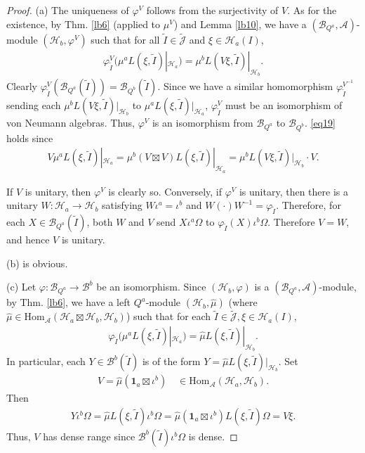 \documentclass[11pt,b5paper,notitlepage]{article}
\theoremstyle{definition}
\theoremstyle{plain}
\newcommand{\mc}{\mathcal}
\newcommand{\wtd}{\widetilde}
\newcommand{\wht}{\widehat}
\newcommand{\id}{\mathbf{1}}
\newcommand{\Hom}{\mathrm{Hom}}
\newcommand{\Jtd}{\widetilde{\mathcal J}}
\numberwithin{equation}{section}
\begin{document}
\begin{proof}
(a) The uniqueness of $\varphi^V$ follows from the surjectivity of $V$. As for the existence, by Thm. \ref{lb6} (applied to $\mu^V$) and Lemma \ref{lb10}, we have a $(\mc B_{Q^a},\mc A)$-module $(\mc H_b,\varphi^V)$ such that for all $\wtd I\in\Jtd$ and $\xi\in\mc H_a(I)$,
\begin{align}
\varphi^V_{\wtd I}\big(\mu^aL(\xi,\wtd I)|_{\mc H_a}\big)=\mu^b L(V\xi,\wtd I)|_{\mc H_b}.	
\end{align}
Clearly $\varphi^V_{\wtd I}(\mc B_{Q^a}(\wtd I))=\mc B_{Q^b}(\wtd I)$. Since we have a similar homomorphism $\varphi_{\wtd I}^{V^{-1}}$ sending each $\mu^b L(V\xi,\wtd I)|_{\mc H_b}$ to $\mu^aL(\xi,\wtd I)|_{\mc H_a}$, $\varphi^V_{\wtd I}$ must be an isomorphism of von Neumann algebras. Thus, $\varphi^V$ is an isomorphism from $\mc B_{Q^a}$ to $\mc B_{Q^b}$. \eqref{eq19} holds since
\begin{align*}
V\mu^a L(\xi,\wtd I)|_{\mc H_a}=\mu^b(V\boxtimes V)L(\xi,\wtd I)|_{\mc H_a}=\mu^b L(V\xi,\wtd I)|_{\mc H_b}\cdot V.	
\end{align*}

If $V$ is unitary, then $\varphi^V$ is clearly so. Conversely, if $\varphi^V$ is unitary, then there is a unitary  $W:\mc H_a\rightarrow\mc H_b$ satisfying $W\iota^a=\iota^b$ and $W(\cdot )W^{-1}=\varphi_{\wtd I}$. Therefore, for each $X\in\mc B_{Q^a}(\wtd I)$, both $W$ and $V$ send $X\iota^a\Omega$ to $\varphi_{\wtd I}(X)\iota^b\Omega$. Therefore $V=W$, and hence $V$ is unitary. 

(b) is obvious.

(c) Let $\varphi:\mc B_{Q^a}\rightarrow\mc B^b$ be an isomorphism. Since $(\mc H_b,\varphi)$ is a $(\mc B_{Q^a},\mc A)$-module, by Thm. \ref{lb6}, we have a left $Q^a$-module $(\mc H_b,\wht\mu)$ (where $\wht\mu\in\Hom_{\mc A}(\mc H_a\boxtimes\mc H_b,\mc H_b)$) such that for each $\wtd I\in\Jtd,\xi\in\mc H_a(I)$,
\begin{align*}
\varphi_{\wtd I}\big(\mu^aL(\xi,\wtd I)|_{\mc H_a}\big)=\wht\mu L(\xi,\wtd I)|_{\mc H_b}.	
\end{align*}
In particular, each $Y\in\mc B^b(\wtd I)$ is of the form $Y=\wht\mu L(\xi,\wtd I)|_{\mc H_b}$. Set
\begin{align}
V=\wht\mu(\id_a\boxtimes\iota^b)\quad\in\Hom_{\mc A}(\mc H_a,\mc H_b).	\label{eq21}
\end{align}
Then
\begin{align*}
Y\iota^b\Omega=	\wht\mu L(\xi,\wtd I)\iota^b\Omega=\wht\mu(\id_a\boxtimes\iota^b)L(\xi,\wtd I)\Omega=V\xi.
\end{align*}
Thus, $V$ has dense range since $\mc B^b(\wtd I)\iota^b\Omega$ is dense.


\end{proof}
\end{document}
